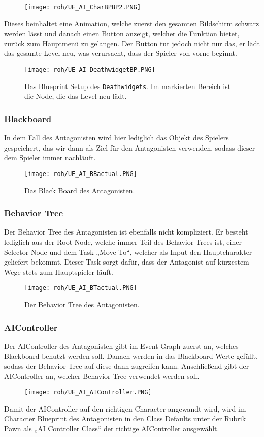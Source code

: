 \begin{figure}[H]
    \centering
    \texttt{[image: roh/UE\_AI\_CharBPBP2.PNG]}
    \label{UE:AI_CharBPBP2}
\end{figure}
Dieses beinhaltet eine Animation, welche zuerst den gesamten Bildschirm schwarz werden lässt und danach einen Button anzeigt, welcher die Funktion bietet, zurück zum Hauptmenü zu gelangen. Der Button tut jedoch nicht nur das, er lädt das gesamte Level neu, was verursacht, dass der Spieler von vorne beginnt.
\begin{figure}[H]
    \centering
    \texttt{[image: roh/UE\_AI\_DeathwidgetBP.PNG]}
    \caption{Das Blueprint Setup des {\tt Deathwidgets}. Im markierten Bereich ist die Node, die das Level neu lädt.}
    \label{UE:AI_DeathwidgetBP}
\end{figure}
\subsubsection{Blackboard}
In dem Fall des Antagonisten wird hier lediglich das Objekt des Spielers gespeichert, das wir dann als Ziel für den Antagonisten verwenden, sodass dieser dem Spieler immer nachläuft.
\begin{figure}[H]
    \centering
    \texttt{[image: roh/UE\_AI\_BBactual.PNG]}
    \caption{Das Black Board des Antagonisten.}
    \label{UE:AI_BBactual}
\end{figure}
\subsubsection{Behavior Tree}
Der Behavior Tree des Antagonisten ist ebenfalls nicht kompliziert. Er besteht lediglich aus der Root Node, welche immer Teil des Behavior Trees ist, einer Selector Node und dem Task „Move To“, welcher als Input den Hauptcharakter geliefert bekommt. Dieser Task sorgt dafür, dass der Antagonist auf kürzestem Wege stets zum Hauptspieler läuft.
\begin{figure}[H]
    \centering
    \texttt{[image: roh/UE\_AI\_BTactual.PNG]}
    \caption{Der Behavior Tree des Antagonisten.}
    \label{UE:AI_BTactual}
\end{figure}
\subsubsection{AIController}
Der AIController des Antagonisten gibt im Event Graph zuerst an, welches Blackboard benutzt werden soll. Danach werden in das Blackboard Werte gefüllt, sodass der Behavior Tree auf diese dann zugreifen kann. Anschließend gibt der AIController an, welcher Behavior Tree verwendet werden soll.
\begin{figure}[H]
    \centering
    \texttt{[image: roh/UE\_AI\_AIController.PNG]}
    \label{UE:AI_AIController}
\end{figure}
Damit der AIController auf den richtigen Character angewandt wird, wird im Character Blueprint des Antagonisten in den Class Defaults unter der Rubrik Pawn als „AI Controller Class“ der richtige AIController ausgewählt.

